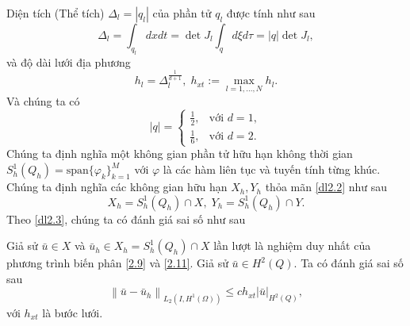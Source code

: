 \documentclass[]{article}
\begin{document}
Diện tích (Thể tích) $\Delta_l=|q_l|$ của phần tử $q_l$ được tính như sau
$$\Delta_l=\int_{q_l}dxdt=\det J_l\int_q d\xi d\tau=|q|\det J_l,$$
và độ dài lưới địa phương
$$h_l=\Delta_l^{\frac{1}{d+1}},\; h_{xt}:=\max_{l=1, ..., N}h_l.$$
Và chúng ta có
$$|q|=\begin{cases}
	\frac{1}{2},& \text{với } d=1,\\[0.3cm]
	\frac{1}{6},& \text{với } d=2.
\end{cases}$$
Chúng ta định nghĩa một không gian phần tử hữu hạn không thời gian $S^1_h(Q_h)=\text{span}\{\varphi_k\}_{k=1}^M$ với $\varphi$ là các hàm liên tục và tuyến tính từng khúc. Chúng ta định nghĩa các không gian hữu hạn $X_h, Y_h$ thỏa mãn \cref{dl2.2} như sau
$$X_h=S^1_h(Q_h)\cap X,\; Y_h=S^1_h(Q_h)\cap Y.$$
Theo \cref{dl2.3}, chúng ta có đánh giá sai số như sau
\begin{dl}\label{dl2.4}
	Giả sử $\bar{u}\in X$ và $\bar{u}_h\in X_h=S^1_h(Q_h)\cap X$ lần lượt là nghiệm duy nhất của phương trình biến phân \eqref{2.9} và \eqref{2.11}. Giả sử $\bar{u}\in H^2(Q)$. Ta có đánh giá sai số sau
	\begin{equation}\label{2.17}
	\left\|\bar{u}-\bar{u}_h \right\|_{L_2(I, H^1(\Omega))}\leq ch_{xt}\left|\bar{u}\right|_{H^2(Q)},
	\end{equation}
	với $h_{xt}$ là bước lưới.
\end{dl}
\end{document}
